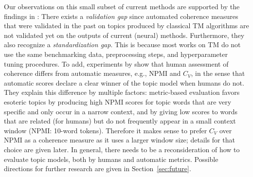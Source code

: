 \documentclass[11pt]{article}
\begin{document}
Our observations on this small subset of current methods are supported by the findings in \citet{incoherence}: There exists a \emph{validation gap} since automated coherence measures that were validated in the past on topics produced by classical TM algorithms are not validated yet on the outputs of current (neural) methods.
Furthermore, they also recognize a \emph{standardization gap}. This is because most works on TM do not use the same benchmarking data, preprocessing steps, and hyperparameter tuning procedures.
To add, experiments by \citet{incoherence} show that human assessment of coherence differs from automatic measures, e.g., NPMI and $C_V$, in the sense that automatic scores declare a clear winner of the topic model when humans do not. They explain this difference by multiple factors: metric-based evaluation favors esoteric topics by producing high NPMI scores for topic words that are very specific and only occur in a narrow context, and by giving low scores to words that are related (for humans) but do not frequently appear in a small context window (NPMI: 10-word tokens). Therefore it makes sense to prefer $C_V$ over NPMI as a coherence measure as it uses a larger window size; details for that choice are given later. 
In general, there needs to be a reconsideration of how to evaluate topic models, both by humans and automatic metrics. Possible directions for further research are given in Section~\ref{sec:future}. 
\end{document}

